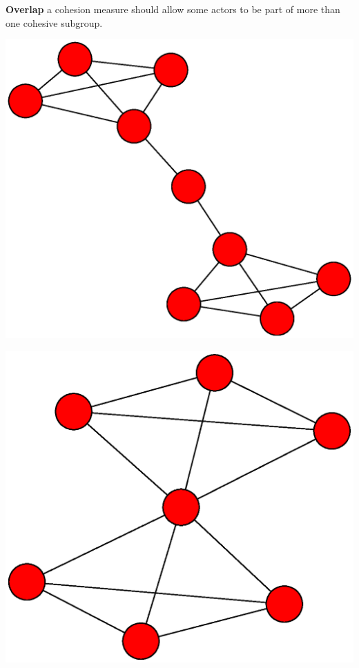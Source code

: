 \documentclass[ignorenonframetext,red,8pt,notes=show]{beamer}
\begin{document}
\begin{frame}[label=]
\begin{columns}[c]
\begin{column}{0.3\textwidth}
\textbf{Overlap} a cohesion measure should allow some actors to be part of more than one cohesive subgroup.

\begin{center}
\includegraphics[scale=0.1]{img/hole}
\end{center}

\begin{center}
\includegraphics[scale=0.1]{img/fold}
\end{center}
\end{column}


\end{columns}
\end{frame}
\end{document}
